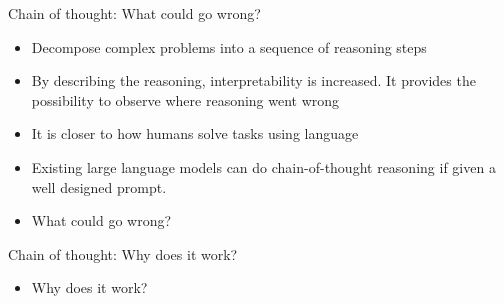 
\begin{frame}{Chain of thought: What could go wrong?}

\vfill

\begin{itemize}
    \item Decompose complex problems into a sequence of reasoning steps
    \item By describing the reasoning, interpretability is increased. It provides the possibility to observe where reasoning went wrong
    \item It is closer to how humans solve tasks using language
    \item Existing large language models can do
    chain-of-thought reasoning if given a well designed prompt.

\item \ques What could go wrong?
\end{itemize}

\vfill

\end{frame}

\begin{frame}{Chain of thought: Why does it work?}

\vfill

\begin{itemize}
    \item \ques Why does it work?
\end{itemize}

\vfill

\end{frame}



\endlecture


